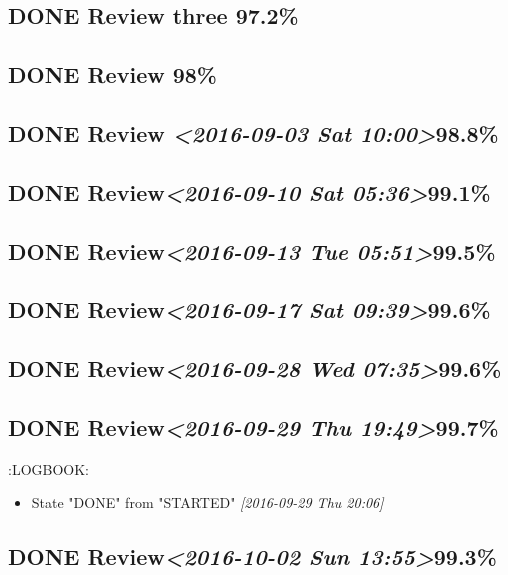 \documentclass[11pt]{ctexart}
\begin{document}
\subsection{{\bfseries\sffamily DONE} Review three 97.2\%}
\label{sec:org6bd059d}

\subsection{{\bfseries\sffamily DONE} Review 98\%}
\label{sec:org764b3de}
\subsection{{\bfseries\sffamily DONE} Review \textit{<2016-09-03 Sat 10:00>}98.8\%}
\label{sec:org119aff2}
\subsection{{\bfseries\sffamily DONE} Review\textit{<2016-09-10 Sat 05:36>}99.1\%}
\label{sec:orgff49c68}
\subsection{{\bfseries\sffamily DONE} Review\textit{<2016-09-13 Tue 05:51>}99.5\%}
\label{sec:orga624eee}
\subsection{{\bfseries\sffamily DONE} Review\textit{<2016-09-17 Sat 09:39>}99.6\%}
\label{sec:org7f25de1}
\subsection{{\bfseries\sffamily DONE} Review\textit{<2016-09-28 Wed 07:35>}99.6\%}
\label{sec:orgb163c09}
\subsection{{\bfseries\sffamily DONE} Review\textit{<2016-09-29 Thu 19:49>}99.7\%}
\label{sec:orgcd5c7f2}
:LOGBOOK:
\begin{itemize}
\item State "DONE"       from "STARTED"    \textit{[2016-09-29 Thu 20:06]}
\end{itemize}
\subsection{{\bfseries\sffamily DONE} Review\textit{<2016-10-02 Sun 13:55>}99.3\%}
\label{sec:org7295150}
\end{document}
